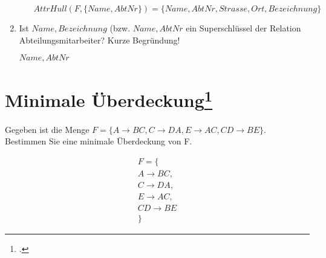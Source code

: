 \documentclass{lehramt-informatik}
\begin{document}
\begin{enumerate}
\begin{enumerate}
\begin{antwort}[richtig]
$AttrHull(F, \{Name, AbtNr\}) = \{Name, AbtNr, Strasse, Ort, Bezeichnung\}$
\end{antwort}
\end{enumerate}


\item Ist ${Name, Bezeichnung}$ (bzw. ${Name, AbtNr}$ ein Superschlüssel
der Relation Abteilungsmitarbeiter? Kurze Begründung!

\begin{antwort}[richtig]
${Name, AbtNr}$
\end{antwort}

\end{enumerate}

%

\section{Minimale Überdeckung\footcite[Seite 1, Aufgabe 2]{db:ab:5}}

Gegeben ist die Menge $F = \{A \rightarrow BC, C \rightarrow DA, E
\rightarrow AC, CD \rightarrow BE\}$. Bestimmen Sie eine minimale
Überdeckung von F.

\begin{multline*}
F = \{ \\
  A \rightarrow BC, \\
  C \rightarrow DA, \\
  E \rightarrow AC, \\
  CD \rightarrow BE \\
\}
\end{multline*}
\end{document}
